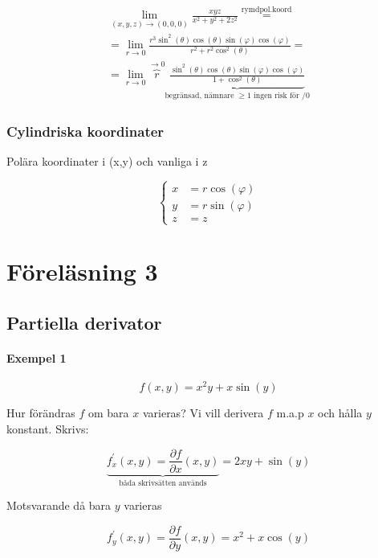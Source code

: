 \documentclass{article}
\begin{document}
\[
\begin{split}
	\lim_{(x,y,z) \rightarrow (0,0,0)} \frac{xyz}{x^2+y^2+2z^2} \overset{\mathrm{rymdpol.koord}}{=} \\
	= \lim_{r \rightarrow 0} \frac{r^3 \sin^2(\theta) \cos(\theta) \sin(\varphi) \cos(\varphi)}{r^2+r^2 \cos^2(\theta)} = \\
	= \lim_{r \rightarrow 0} \overbrace{r}^{\rightarrow 0} \underbrace{\frac{\sin^2(\theta) \cos(\theta) \sin(\varphi) \cos(\varphi)}{1+\cos^2(\theta)}}_\text{begränsad, nämnare \(\geq 1 \) ingen risk för /0}
\end{split}
\]

\subsubsection{Cylindriska koordinater}

Polära koordinater i (x,y) och vanliga i z

\[
\left\{\begin{array}{rcl}
	x & = r \cos(\varphi) \\
	y & = r \sin(\varphi) \\
	z & = z 
\end{array}\right.
\]

\newpage
\section{Föreläsning 3}
\subsection{Partiella derivator}

\paragraph{Exempel 1}

\begin{equation} \label{eq:3.1}
	f(x,y) = x^2y + x\sin(y)
\end{equation}

Hur förändras \(f\) om bara \(x\) varieras? Vi vill derivera \(f\) m.a.p \(x\) och hålla \(y\) konstant. Skrivs:

\[
	\underbrace{f^{\prime}_{x}(x,y) = \frac{\partial f}{\partial x}(x,y)}_{\text{båda skrivsätten används}} = 2xy+\sin(y)
\]

Motsvarande då bara \(y\) varieras

\[
	f^{\prime}_{y}(x,y) = \frac{\partial f}{\partial y}(x,y) = x^2 + x\cos(y)
\]
\end{document}
